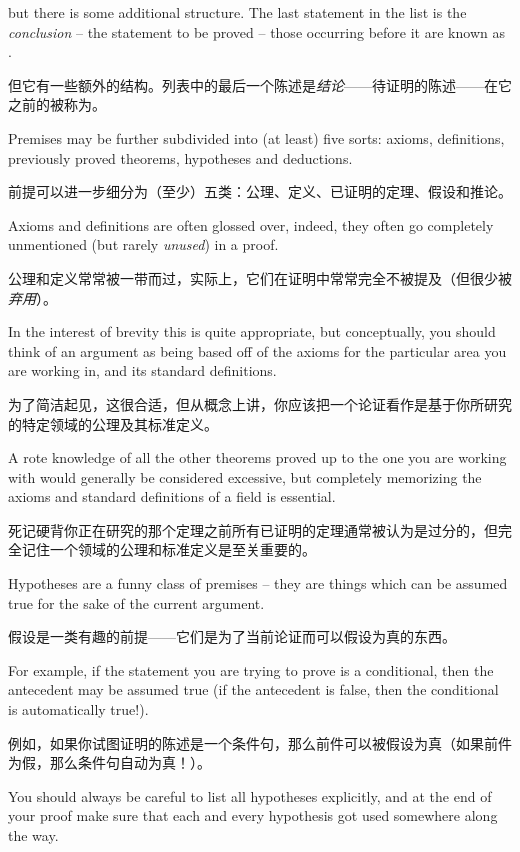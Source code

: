 but there is some additional structure.
The last statement in the list is the {\em conclusion} -- the statement
to be proved -- those occurring before it are known as 
.

但它有一些额外的结构。列表中的最后一个陈述是{\em 结论}——待证明的陈述——在它之前的被称为。

Premises may be further subdivided into (at least) five sorts: axioms,
definitions, previously proved theorems, hypotheses and deductions.

前提可以进一步细分为（至少）五类：公理、定义、已证明的定理、假设和推论。

Axioms and definitions are often glossed
over, indeed, they often go completely unmentioned (but rarely {\em unused}) 
in a proof.

公理和定义常常被一带而过，实际上，它们在证明中常常完全不被提及（但很少被{\em 弃用}）。

In the interest of brevity this is quite appropriate, but 
conceptually, you should think of an argument as being based off of 
the axioms for the particular area you are working in, and its standard 
definitions.

为了简洁起见，这很合适，但从概念上讲，你应该把一个论证看作是基于你所研究的特定领域的公理及其标准定义。

A rote knowledge of all the other theorems proved up to
the one you are working with would generally be considered excessive, 
but completely memorizing the axioms and standard definitions of a field 
is essential.

死记硬背你正在研究的那个定理之前所有已证明的定理通常被认为是过分的，但完全记住一个领域的公理和标准定义是至关重要的。

Hypotheses are a funny class of premises -- they are things
which can be assumed true for the sake of the current argument.

假设是一类有趣的前提——它们是为了当前论证而可以假设为真的东西。

For
example, if the statement you are trying to prove is a conditional,
then the antecedent may be assumed true (if the antecedent is false,
then the conditional is automatically true!).

例如，如果你试图证明的陈述是一个条件句，那么前件可以被假设为真（如果前件为假，那么条件句自动为真！）。

You should always be
careful to list all hypotheses explicitly, and at the end of your 
proof make sure that each and every hypothesis got used somewhere 
along the way.

